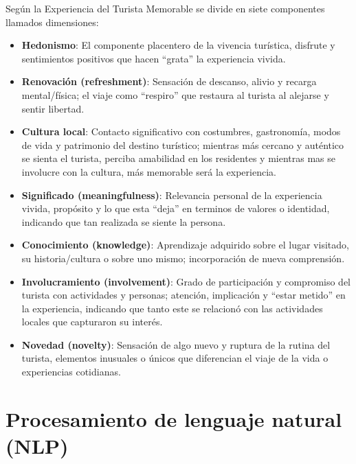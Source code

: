 Según \parencite{kim2012development} la Experiencia del Turista Memorable se divide en siete componentes llamados dimensiones:
\begin{itemize}

  \item \textbf{Hedonismo}: El componente placentero de la vivencia turística, disfrute y sentimientos positivos que hacen “grata” la experiencia vivida.
   
  \item \textbf{Renovación (refreshment)}: Sensación de descanso, alivio y recarga mental/física; el viaje como “respiro” que restaura al turista al alejarse y sentir libertad.
   
  \item \textbf{Cultura local}: Contacto significativo con costumbres, gastronomía, modos de vida y patrimonio del destino turístico; mientras más cercano y auténtico se sienta el turista, perciba amabilidad en los residentes y mientras mas se involucre con la cultura, más memorable será la experiencia.
   
  \item \textbf{Significado (meaningfulness)}: Relevancia personal de la experiencia vivida, propósito y lo que esta “deja” en terminos de valores o identidad, indicando que tan realizada se siente la persona.
   
  \item \textbf{Conocimiento (knowledge)}: Aprendizaje adquirido sobre el lugar visitado, su historia/cultura o sobre uno mismo; incorporación de nueva comprensión.
   
  \item \textbf{Involucramiento (involvement)}: Grado de participación y compromiso del turista con actividades y personas; atención, implicación y “estar metido” en la experiencia, indicando que tanto este se relacionó con las actividades locales que capturaron su interés.
  
  \item \textbf{Novedad (novelty)}: Sensación de algo nuevo y ruptura de la rutina del turista, elementos inusuales o únicos que diferencian el viaje de la vida o experiencias cotidianas.
   
\end{itemize}



\section{Procesamiento de lenguaje natural (NLP)} 
\label{sec:nlp}

